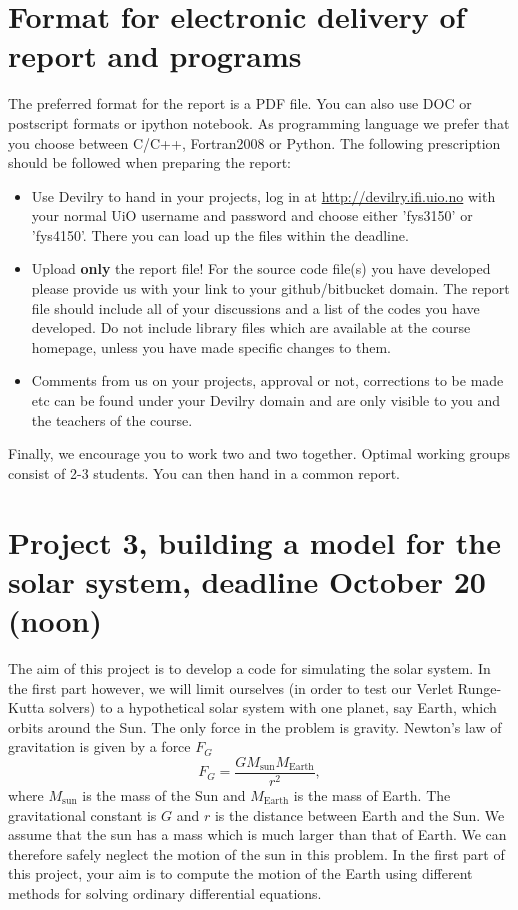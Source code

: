 \documentclass[a4wide,12pt]{article}
\begin{document}
\section*{Format for electronic delivery of report and programs}
%
The preferred format for the report is a PDF file. You can also
use DOC or postscript formats or ipython notebook. 
As programming language we prefer that you choose between C/C++, Fortran2008 or Python.
The following prescription should be followed when preparing the report:
\begin{itemize}
\item Use Devilry to hand in your projects, log in  at 
\url{ http://devilry.ifi.uio.no} with your normal UiO username and password
and choose either 'fys3150' or 'fys4150'.
There you can load up the files within the deadline.
\item Upload {\bf only} the report file!  For the source code file(s) you have developed please provide us with your link to your github/bitbucket domain. 
The report file should include all of your discussions and a list of the codes you have developed. 
Do not include library files which are available at the course homepage, unless you have
made specific changes to them.
\item Comments  from us on your projects, approval or not, corrections to be made 
etc can be found under
your Devilry domain and are only visible to you and the teachers of the course.

\end{itemize}

Finally, 
we encourage you to work two and two together. Optimal working groups consist of 
2-3 students. You can then hand in a common report. 

\section*{Project 3, building a model for the solar system, deadline   October 20 (noon)}
The aim of this project is to develop a code for simulating the solar system. 
In the first part however, we will limit ourselves (in order to test our Verlet Runge-Kutta solvers) 
to a hypothetical solar system
with one planet, say Earth, which orbits around the Sun.
The only force in the problem is gravity. Newton's law of gravitation  is given by a force $F_G$
\[
F_G=\frac{GM_{\mathrm{sun}}M_{\mathrm{Earth}}}{r^2},
\]
where $M_{\mathrm{sun}}$ is the mass of the Sun and $M_{\mathrm{Earth}}$ is the mass of Earth. The gravitational constant is $G$ and $r$ is the distance between Earth and the Sun.
We assume that the sun has a mass which is much larger 
than that of Earth. We can therefore safely neglect the 
motion of the sun in this problem.  In the first part of this project, your aim is to compute the motion
of the Earth using different methods for solving ordinary differential equations.
\end{document}
